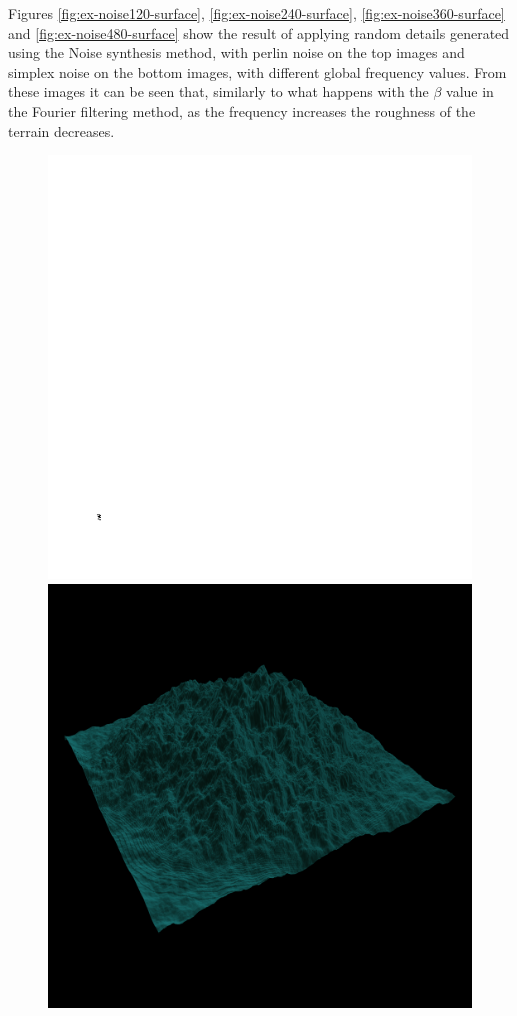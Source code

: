     Figures \ref{fig:ex-noise120-surface}, \ref{fig:ex-noise240-surface}, \ref{fig:ex-noise360-surface} and \ref{fig:ex-noise480-surface} show the result of applying random details generated using the Noise synthesis method, with perlin noise on the top images and simplex noise on the bottom images, with different global frequency values. From these images it can be seen that, similarly to what happens with the $\beta$ value in the Fourier filtering method, as the frequency increases the roughness of the terrain decreases.
      
	\begin{figure}[H]
	  \centering
	  \includegraphics[width=\imagewidth]{images/results/terrains/512-1/perlin/120}
	  \includegraphics[width=\imagewidth]{images/results/terrains/512-1/perlin/120_3d} \\[0.25em]

\end{figure}
